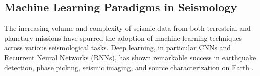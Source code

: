 \documentclass[conference]{IEEEtran}
\begin{document}





    \subsection{ Machine Learning Paradigms in Seismology }
        The increasing volume and complexity of seismic data from both terrestrial and planetary missions have spurred the
        adoption of machine learning techniques across various seismological tasks. Deep learning, in particular CNNs and
        Recurrent Neural Networks (RNNs), has shown remarkable success in earthquake detection, phase picking, seismic
        imaging, and source characterization on Earth \cite{MousaviBeroza2022}.
\end{document}
